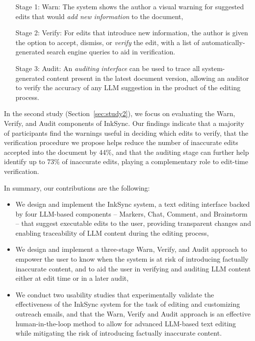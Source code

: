 \documentclass[manuscript]{acmart}
\begin{document}
\begin{itemize}
\setlength{\itemindent}{.8in}
\item[Stage 1: Warn:] The system shows the author a visual warning for suggested edits that would \textit{add new information} to the document,
\item[Stage 2: Verify:] For edits that introduce new information, the author is given the option to accept, dismiss, or \textit{verify} the edit, with a list of automatically-generated search engine queries to aid in verification.
\item[Stage 3: Audit:] 
An \textit{auditing interface} can be used to trace all system-generated content present in the latest document version, allowing an auditor to verify the accuracy of any LLM suggestion in the product of the editing process.
\end{itemize}

In the second study (Section~\ref{sec:study2}), we focus on evaluating the Warn, Verify, and Audit components of InkSync. Our findings indicate that a majority of participants find the warnings useful in deciding which edits to verify, that the verification procedure we propose helps reduce the number of inaccurate edits accepted into the document by 44\%, and that the auditing stage can further help identify up to 73\% of inaccurate edits, playing a complementary role to edit-time verification.

In summary, our contributions are the following:
\begin{itemize}
    \item We design and implement the InkSync system, a text editing interface backed by four LLM-based components -- Markers, Chat, Comment, and Brainstorm -- that suggest executable edits to the user, providing transparent changes and enabling traceability of LLM content during the editing process,
    \item We design and implement a three-stage Warn, Verify, and Audit approach to empower the user to know when the system is at risk of introducing factually inaccurate content, and to aid the user in verifying and auditing LLM content either at edit time or in a later audit,
    \item We conduct two usability studies that experimentally validate the effectiveness of the InkSync system for the task of editing and customizing outreach emails, and that the Warn, Verify and Audit approach is an effective human-in-the-loop method to allow for advanced LLM-based text editing while mitigating the risk of introducing factually inaccurate content.
\end{itemize}
\end{document}
